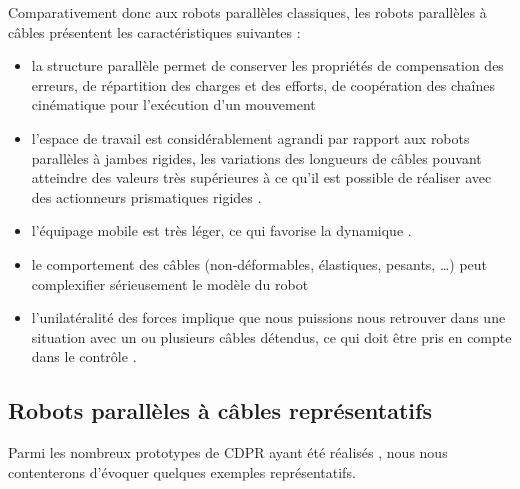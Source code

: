 Comparativement donc aux robots parallèles classiques, les robots parallèles à 
câbles présentent les caractéristiques suivantes :
\begin{itemize}
 \item la structure parallèle permet de conserver les propriétés de 
compensation des erreurs, de répartition des charges et des efforts, de coopération des 
chaînes cinématique pour l'exécution d'un mouvement
 \item l'espace de travail est considérablement agrandi par rapport aux robots 
parallèles à jambes rigides, les variations des longueurs de câbles pouvant 
atteindre des valeurs très supérieures à ce qu'il est possible de réaliser 
avec des actionneurs prismatiques rigides \cite{riehl2010}.
 \item l'équipage mobile est très léger, ce qui favorise la dynamique 
\cite{kawamura1995}.
 \item le comportement des câbles (non-déformables, élastiques, pesants, \dots) 
peut complexifier s\'erieusement le modèle du robot \cite{riehl2009} 
\cite{merlet2004interferences} \cite{lolo2014}
 \item l'unilatéralité des forces implique que nous puissions nous retrouver 
dans une situation avec un ou plusieurs câbles détendus, ce qui doit être pris 
en compte dans le contrôle \cite{merlet2013openissues}.
\end{itemize}


\subsection{Robots parall\`eles à c\^ables repr\'esentatifs} \label{chap0-1-0}

Parmi les nombreux prototypes de CDPR ayant \'et\'e r\'ealis\'es 
\cite{kawamura1995} \cite{agrawal2005} \cite{fast2011}, nous nous contenterons 
d'\'evoquer quelques exemples repr\'esentatifs.\\

